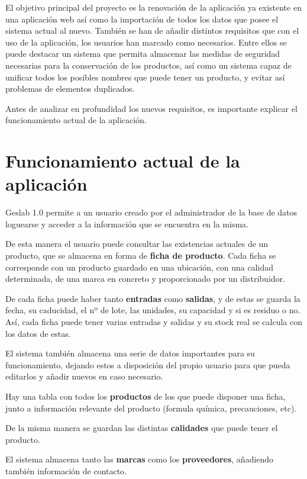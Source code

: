 
El objetivo principal del proyecto es la renovación de la aplicación ya existente en una aplicación web así como la importación de todos los datos que posee el sistema actual al nuevo. También se han de añadir distintos requisitos que con el uso de la aplicación, los usuarios han marcado como necesarios. Entre ellos se puede destacar un sistema que permita almacenar las medidas de seguridad necesarias para la conservación de los productos, así como un sistema capaz de unificar todos los posibles nombres que puede tener un producto, y evitar así problemas de elementos duplicados.

Antes de analizar en profundidad los nuevos requisitos, es importante explicar el funcionamiento actual de la aplicación.


\section{Funcionamiento actual de la aplicación}

Geslab 1.0 permite a un usuario creado por el administrador de la base de datos loguearse y acceder a la información que se encuentra en la misma.

De esta manera el usuario puede consultar las existencias actuales de un producto, que se almacena en forma de \textbf{ficha de producto}. Cada ficha se corresponde con un producto guardado en una ubicación, con una calidad determinada, de una marca en concreto y proporcionado por un distribuidor.

De cada ficha puede haber tanto \textbf{entradas} como \textbf{salidas}, y de estas se guarda la fecha, su caducidad, el nº de lote, las unidades, su capacidad y si es residuo o no. Así, cada ficha puede tener varias entradas y salidas y su stock real se calcula con los datos de estas.

El sistema también almacena una serie de datos importantes para su funcionamiento, dejando estos a disposición del propio usuario para que pueda editarlos y añadir nuevos en caso necesario.   

Hay una tabla con todos los \textbf{productos} de los que puede disponer una ficha, junto a información relevante del producto (formula química, precauciones, etc).

De la misma manera se guardan las distintas \textbf{calidades} que puede tener el producto.

El sistema almacena tanto las \textbf{marcas} como los \textbf{proveedores}, añadiendo también información de contacto.

